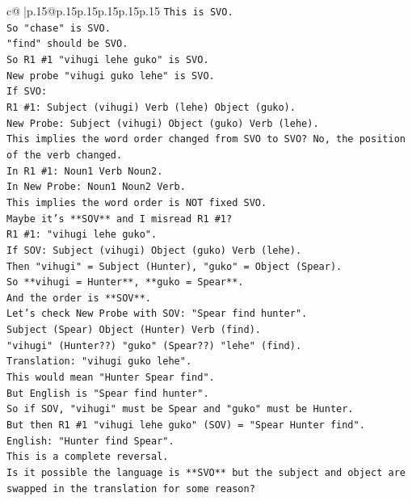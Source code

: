 \documentclass{article}
\begin{document}
{\begin{supertabular}{c@{$\;$}|p{.15\linewidth}@{}p{.15\linewidth}p{.15\linewidth}p{.15\linewidth}p{.15\linewidth}p{.15\linewidth}}
{{{\texttt{This is SVO.} \\
\texttt{So "chase" is SVO.} \\
\texttt{"find" should be SVO.} \\
\texttt{So R1 \#1 "vihugi lehe guko" is SVO.} \\
\texttt{New probe "vihugi guko lehe" is SVO.} \\
\texttt{If SVO:} \\
\texttt{R1 \#1: Subject (vihugi) Verb (lehe) Object (guko).} \\
\texttt{New Probe: Subject (vihugi) Object (guko) Verb (lehe).} \\
\texttt{This implies the word order changed from SVO to SVO? No, the position of the verb changed.} \\
\texttt{In R1 \#1: Noun1 Verb Noun2.} \\
\texttt{In New Probe: Noun1 Noun2 Verb.} \\
\texttt{This implies the word order is NOT fixed SVO.} \\
\texttt{Maybe it's **SOV** and I misread R1 \#1?} \\
\texttt{R1 \#1: "vihugi lehe guko".} \\
\texttt{If SOV: Subject (vihugi) Object (guko) Verb (lehe).} \\
\texttt{Then "vihugi" = Subject (Hunter), "guko" = Object (Spear).} \\
\texttt{So **vihugi = Hunter**, **guko = Spear**.} \\
\texttt{And the order is **SOV**.} \\
\texttt{Let's check New Probe with SOV: "Spear find hunter".} \\
\texttt{Subject (Spear) Object (Hunter) Verb (find).} \\
\texttt{"vihugi" (Hunter??) "guko" (Spear??) "lehe" (find).} \\
\texttt{Translation: "vihugi guko lehe".} \\
\texttt{This would mean "Hunter Spear find".} \\
\texttt{But English is "Spear find hunter".} \\
\texttt{So if SOV, "vihugi" must be Spear and "guko" must be Hunter.} \\
\texttt{But then R1 \#1 "vihugi lehe guko" (SOV) = "Spear Hunter find".} \\
\texttt{English: "Hunter find Spear".} \\
\texttt{This is a complete reversal.} \\
\texttt{Is it possible the language is **SVO** but the subject and object are swapped in the translation for some reason?} \\
}}}
\end{supertabular}}
\end{document}
